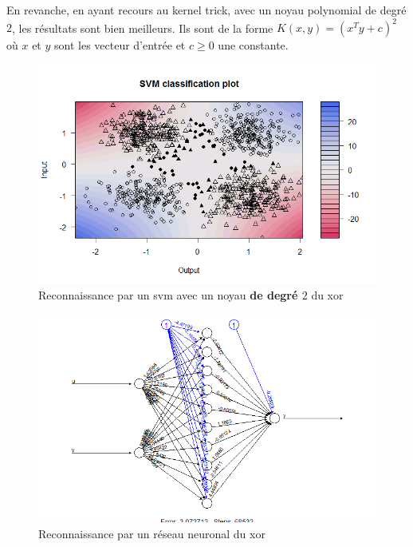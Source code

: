 \documentclass{article}
\theoremstyle{definition}
\begin{document}
\newpage

\noindent En revanche, en ayant recours au kernel trick, avec un noyau polynomial de degré $2$, les résultats sont bien meilleurs. Ils sont de la forme $K(x,y)=(x^T y+c)^2$ où $x$ et $y$ sont les vecteur d'entrée et $c\geq 0$ une constante.\\

\begin{figure}[!h]\centering
\includegraphics[scale=0.6]{svmxorplydot.png}
\caption{Reconnaissance par un svm  avec un noyau \textbf{de degré $2$} du xor}
\label{fig:svmpolydot}
\end{figure}

\newpage

\begin{figure}[!h]\centering
\includegraphics[scale=0.6]{nnxor.png}
\caption{Reconnaissance par un réseau neuronal du xor}
\label{fig:nnxor}
\end{figure}
\end{document}
